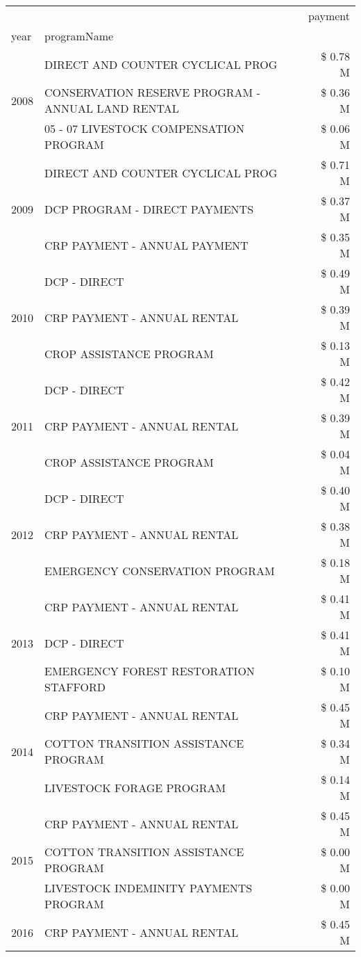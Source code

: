 \begin{tabular}{llr}
\toprule
 &  & payment \\
year & programName &  \\
\midrule
\multirow[t]{3}{*}{2008} & DIRECT AND COUNTER CYCLICAL PROG & \$ 0.78 M \\
 & CONSERVATION RESERVE PROGRAM - ANNUAL LAND RENTAL & \$ 0.36 M \\
 & 05 - 07 LIVESTOCK COMPENSATION PROGRAM & \$ 0.06 M \\
\cline{1-3}
\multirow[t]{3}{*}{2009} & DIRECT AND COUNTER CYCLICAL PROG & \$ 0.71 M \\
 & DCP PROGRAM - DIRECT PAYMENTS & \$ 0.37 M \\
 & CRP PAYMENT - ANNUAL PAYMENT & \$ 0.35 M \\
\cline{1-3}
\multirow[t]{3}{*}{2010} & DCP - DIRECT & \$ 0.49 M \\
 & CRP PAYMENT - ANNUAL RENTAL & \$ 0.39 M \\
 & CROP ASSISTANCE PROGRAM & \$ 0.13 M \\
\cline{1-3}
\multirow[t]{3}{*}{2011} & DCP - DIRECT & \$ 0.42 M \\
 & CRP PAYMENT - ANNUAL RENTAL & \$ 0.39 M \\
 & CROP ASSISTANCE PROGRAM & \$ 0.04 M \\
\cline{1-3}
\multirow[t]{3}{*}{2012} & DCP - DIRECT & \$ 0.40 M \\
 & CRP PAYMENT - ANNUAL RENTAL & \$ 0.38 M \\
 & EMERGENCY CONSERVATION PROGRAM & \$ 0.18 M \\
\cline{1-3}
\multirow[t]{3}{*}{2013} & CRP PAYMENT - ANNUAL RENTAL & \$ 0.41 M \\
 & DCP - DIRECT & \$ 0.41 M \\
 & EMERGENCY FOREST RESTORATION STAFFORD & \$ 0.10 M \\
\cline{1-3}
\multirow[t]{3}{*}{2014} & CRP PAYMENT - ANNUAL RENTAL & \$ 0.45 M \\
 & COTTON TRANSITION ASSISTANCE PROGRAM & \$ 0.34 M \\
 & LIVESTOCK FORAGE PROGRAM & \$ 0.14 M \\
\cline{1-3}
\multirow[t]{3}{*}{2015} & CRP PAYMENT - ANNUAL RENTAL & \$ 0.45 M \\
 & COTTON TRANSITION ASSISTANCE PROGRAM & \$ 0.00 M \\
 & LIVESTOCK INDEMINITY PAYMENTS PROGRAM & \$ 0.00 M \\
\cline{1-3}
\multirow[t]{3}{*}{2016} & CRP PAYMENT - ANNUAL RENTAL & \$ 0.45 M \\

\end{tabular}
